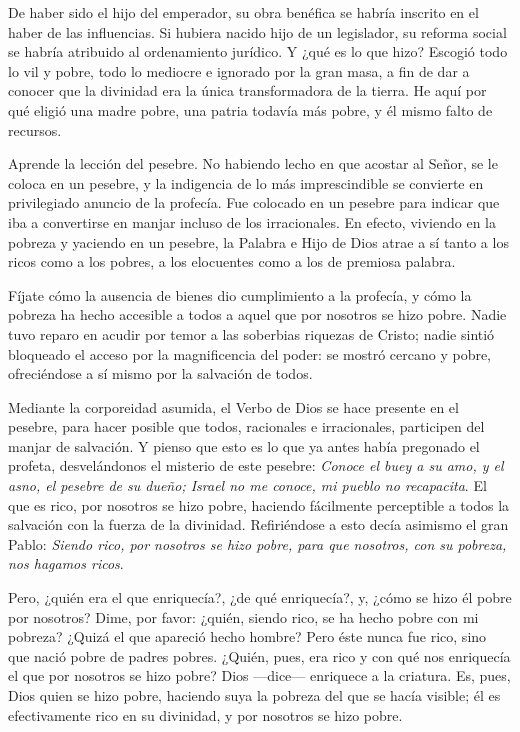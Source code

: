 \begin{body}
\begin{body}
De haber sido el hijo del emperador, su obra benéfica se habría inscrito en el haber de las influencias. Si hubiera nacido hijo de un legislador, su reforma social se habría atribuido al ordenamiento jurídico. Y ¿qué es lo que hizo? Escogió todo lo vil y pobre, todo lo mediocre e ignorado por la gran masa, a fin de dar a conocer que la divinidad era la única transformadora de la tierra. He aquí por qué eligió una madre pobre, una patria todavía más pobre, y él mismo falto de recursos.

Aprende la lección del pesebre. No habiendo lecho en que acostar al Señor, se le coloca en un pesebre, y la indigencia de lo más imprescindible se convierte en privilegiado anuncio de la profecía. Fue colocado en un pesebre para indicar que iba a convertirse en manjar incluso de los irracionales. En efecto, viviendo en la pobreza y yaciendo en un pesebre, la Palabra e Hijo de Dios atrae a sí tanto a los ricos como a los pobres, a los elocuentes como a los de premiosa palabra.

Fíjate cómo la ausencia de bienes dio cumplimiento a la profecía, y cómo la pobreza ha hecho accesible a todos a aquel que por nosotros se hizo pobre. Nadie tuvo reparo en acudir por temor a las soberbias riquezas de Cristo; nadie sintió bloqueado el acceso por la magnificencia del poder: se mostró cercano y pobre, ofreciéndose a sí mismo por la salvación de todos.

Mediante la corporeidad asumida, el Verbo de Dios se hace presente en el pesebre, para hacer posible que todos, racionales e irracionales, participen del manjar de salvación. Y pienso que esto es lo que ya antes había pregonado el profeta, desvelándonos el misterio de este pesebre: \emph{Conoce el buey a su amo, y el asno, el pesebre de su dueño; Israel no me conoce, mi pueblo no recapacita}. El que es rico, por nosotros se hizo pobre, haciendo fácilmente perceptible a todos la salvación con la fuerza de la divinidad. Refiriéndose a esto decía asimismo el gran Pablo: \emph{Siendo rico, por nosotros se hizo pobre, para que nosotros, con su pobreza, nos hagamos ricos}.

Pero, ¿quién era el que enriquecía?, ¿de qué enriquecía?, y, ¿cómo se hizo él pobre por nosotros? Dime, por favor: ¿quién, siendo rico, se ha hecho pobre con mi pobreza? ¿Quizá el que apareció hecho hombre? Pero éste nunca fue rico, sino que nació pobre de padres pobres. ¿Quién, pues, era rico y con qué nos enriquecía el que por nosotros se hizo pobre? Dios ---dice--- enriquece a la criatura. Es, pues, Dios quien se hizo pobre, haciendo suya la pobreza del que se hacía visible; él es efectivamente rico en su divinidad, y por nosotros se hizo pobre.


\end{body}
\end{body}
